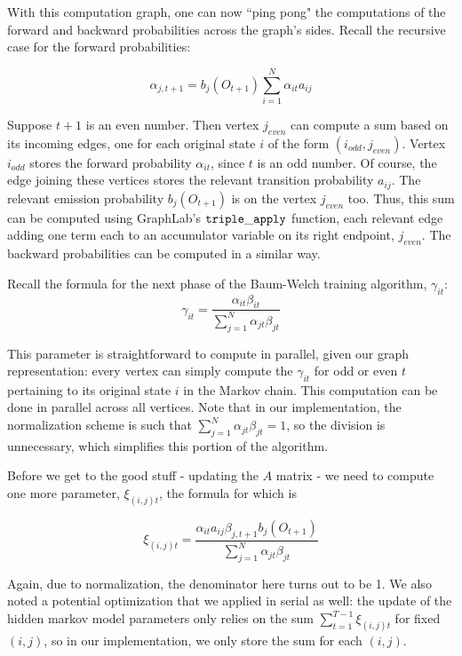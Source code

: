 With this computation graph, one can now ``ping pong" the computations of the forward and backward probabilities across the graph's sides.  Recall the recursive case for the forward probabilities:

$$\alpha_{j, t+1} = b_j(O_{t + 1})\sum_{i = 1}^N \alpha_{it} a_{ij} $$

Suppose $t+1$ is an even number.  Then vertex $j_{even}$ can compute a sum based on its incoming edges, one for each original state $i$ of the form $(i_{odd}, j_{even})$.  Vertex $i_{odd}$ stores the forward probability $\alpha_{i t}$, since $t$ is an odd number.  Of course, the edge joining these vertices stores the relevant transition probability $a_{ij}$.  The relevant emission probability $b_j(O_{t + 1})$ is on the vertex $j_{even}$ too.  Thus, this sum can be computed using GraphLab's $\tt{triple\_apply}$ function, each relevant edge adding one term each to an accumulator variable on its right endpoint, $j_{even}$.  The backward probabilities can be computed in a similar way.

Recall the formula for the next phase of the Baum-Welch training algorithm, $\gamma_{it}$: 
$$\gamma_{it} = \frac{\alpha_{it}\beta_{it}}{\sum_{j = 1}^N \alpha_{jt}\beta_{jt}} $$

This parameter is straightforward to compute in parallel, given our graph representation: every vertex can simply compute the $\gamma_{it}$ for odd or even $t$ pertaining to its original state $i$ in the Markov chain.  This computation can be done in parallel across all vertices.   Note that in our implementation, the normalization scheme is such that $\sum_{j = 1}^N \alpha_{jt}\beta_{jt} = 1$, so the division is unnecessary, which simplifies this portion of the algorithm.

Before we get to the good stuff - updating the $A$ matrix - we need to compute one more parameter, $\xi_{(i,j)t}$, the formula for which is

$$\xi_{(i,j)t} = \frac{\alpha_{it}a_{ij}\beta_{j, t+1} b_j(O_{t+1})}{\sum_{j = 1}^N \alpha_{jt}\beta_{jt}}$$

Again, due to normalization, the denominator here turns out to be 1.  We also noted a potential optimization that we applied in serial as well: the update of the hidden markov model parameters only relies on the sum $\sum_{t = 1}^{T-1} \xi_{(i,j)t} $ for fixed $(i, j)$, so in our implementation, we only store the sum for each $(i, j)$.

